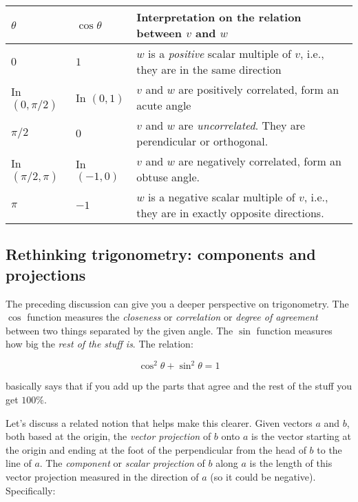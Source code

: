 \documentclass[10pt]{amsart}
\begin{document}
\begin{tabular}{|l|l|l|}
  \hline
  $\theta$ & $\cos \theta$ & Interpretation on the relation between $v$ and $w$\\
  \hline
  $0$ & $1$ & $w$ is a {\em positive} scalar multiple of $v$, i.e., they are in the same direction\\

  \hline

  In $(0,\pi/2)$ & In $(0,1)$ & $v$ and $w$ are positively correlated, form an acute angle\\

  \hline

  $\pi/2$ & $0$ & $v$ and $w$ are {\em uncorrelated}. They are perendicular or orthogonal.\\

  \hline

  In $(\pi/2,\pi)$ & In $(-1,0)$ & $v$ and $w$ are negatively
  correlated, form an obtuse angle.\\
  
  \hline
  
  $\pi$ & $-1$ & $w$ is a negative scalar multiple of $v$, i.e., they
  are in exactly opposite directions.\\

  \hline
\end{tabular}


\subsection{Rethinking trigonometry: components and projections}

The preceding discussion can give you a deeper perspective on
trigonometry. The $\cos$ function measures the {\em closeness} or {\em
correlation} or {\em degree of agreement} between two things separated
by the given angle. The $\sin$ function measures how big the {\em rest
of the stuff is}. The relation:

$$\cos^2\theta + \sin^2\theta = 1$$

basically says that if you add up the parts that agree and the rest of
the stuff you get $100\%$.

Let's discuss a related notion that helps make this clearer. Given
vectors $a$ and $b$, both based at the origin, the {\em vector
projection} of $b$ onto $a$ is the vector starting at the origin and
ending at the foot of the perpendicular from the head of $b$ to the
line of $a$. The {\em component} or {\em scalar projection} of $b$
along $a$ is the length of this vector projection measured in the
direction of $a$ (so it could be negative). Specifically:
\end{document}
